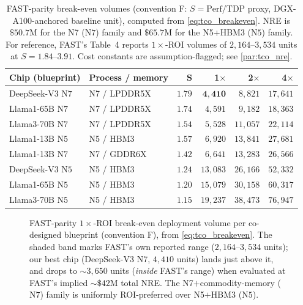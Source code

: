 \begin{table}[t]
\centering
\small
\caption{FAST-parity break-even volumes (convention F: $S=\text{Perf/TDP}$
proxy, DGX-A100-anchored baseline unit), computed from
\cref{eq:tco_breakeven}. NRE is $\$50.7\mathrm{M}$ for the N7 ($\mathrm{N7}$) family
and $\$65.7\mathrm{M}$ for the N5+HBM3 ($\mathrm{N5}$) family. For reference, FAST's
Table~4 reports $1\times$-ROI volumes of $2{,}164\text{--}3{,}534$ units at
$S=1.84\text{--}3.91$. Cost constants are assumption-flagged; see
\cref{par:tco_nre}.}
\label{tab:tco_breakeven}
\begin{tabular}{@{}llrrrr@{}}
\toprule
\textbf{Chip (blueprint)} & \textbf{Process / memory} & $\mathbf{S}$ &
\textbf{1$\times$} & \textbf{2$\times$} & \textbf{4$\times$} \\
\midrule
DeepSeek-V3 $\mathrm{N7}$ & N7 / LPDDR5X & $1.79$ & $\mathbf{4{,}410}$ & $8{,}821$ & $17{,}641$ \\
Llama1-65B $\mathrm{N7}$  & N7 / LPDDR5X & $1.74$ & $4{,}591$ & $9{,}182$ & $18{,}363$ \\
Llama3-70B $\mathrm{N7}$  & N7 / LPDDR5X & $1.54$ & $5{,}528$ & $11{,}057$ & $22{,}114$ \\
Llama1-13B $\mathrm{N5}$  & N5 / HBM3    & $1.57$ & $6{,}920$ & $13{,}841$ & $27{,}681$ \\
Llama1-13B $\mathrm{N7}$  & N7 / GDDR6X  & $1.42$ & $6{,}641$ & $13{,}283$ & $26{,}566$ \\
DeepSeek-V3 $\mathrm{N5}$ & N5 / HBM3    & $1.24$ & $13{,}083$ & $26{,}166$ & $52{,}332$ \\
Llama1-65B $\mathrm{N5}$  & N5 / HBM3    & $1.20$ & $15{,}079$ & $30{,}158$ & $60{,}317$ \\
Llama3-70B $\mathrm{N5}$  & N5 / HBM3    & $1.15$ & $19{,}237$ & $38{,}473$ & $76{,}947$ \\
\bottomrule
\end{tabular}
\end{table}

\begin{figure}[t]
\centering
\caption{FAST-parity $1\times$-ROI break-even deployment volume per co-designed
blueprint (convention F), from \cref{eq:tco_breakeven}. The shaded band marks
FAST's own reported range ($2{,}164\text{--}3{,}534$ units); our best chip
(DeepSeek-V3 $\mathrm{N7}$, $4{,}410$ units) lands just above it, and drops to
${\sim}3{,}650$ units (\emph{inside} FAST's range) when evaluated at FAST's
implied ${\sim}\$42\mathrm{M}$ total NRE. The N7$+$commodity-memory ($\mathrm{N7}$)
family is uniformly ROI-preferred over N5$+$HBM3 ($\mathrm{N5}$).}
\label{fig:tco_breakeven}
\end{figure}

